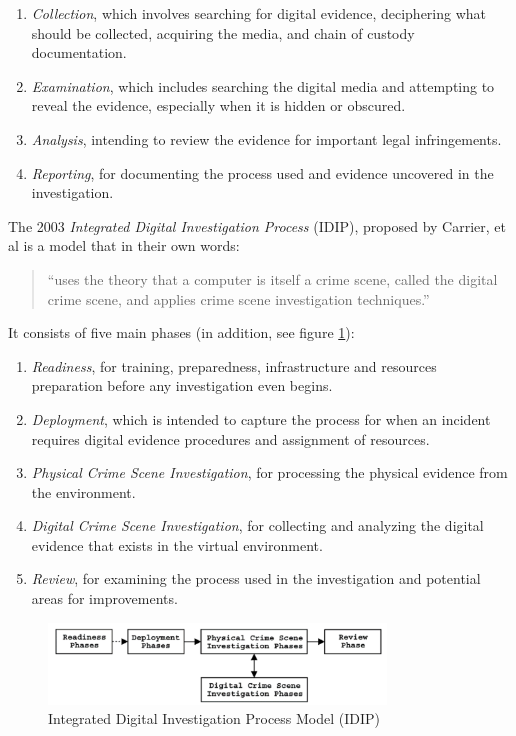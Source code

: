 \documentclass[12pt]{article}
\begin{document}
\begin{enumerate}
  \item {\em Collection}, which involves searching for digital evidence,
  deciphering what should be collected, acquiring the media,
  and chain of custody documentation.
  \item {\em Examination}, which includes searching the digital media
  and attempting to reveal the evidence, especially when it is
  hidden or obscured.
  \item {\em Analysis}, intending to review the evidence for important
  legal infringements. 
  \item {\em Reporting}, for documenting the process used and evidence
  uncovered in the investigation.
\end{enumerate}

The 2003 {\em Integrated Digital Investigation Process} (IDIP)\cite{carrier2003getting},
proposed by Carrier, et al is a model that in their own words:
\begin{quote}
``uses the theory
that a computer is itself a crime scene, called the digital crime scene, and applies crime scene
investigation techniques.''
\end{quote}
It consists of five main phases (in addition, see figure \ref{fig:IDIP}):

\begin{enumerate}
  \item {\em Readiness}, for training, preparedness, infrastructure and resources
  preparation before any investigation even begins.
  \item {\em Deployment}, which is intended to capture the process for when an 
  incident requires digital evidence procedures and assignment of resources.
  \item {\em Physical Crime Scene Investigation}, for processing the physical
  evidence from the environment.
  \item {\em Digital Crime Scene Investigation}, for collecting and
  analyzing the digital evidence that exists in the virtual environment.
  \item {\em Review}, for examining the process used in the investigation and
  potential areas for improvements. 
\end{enumerate}

\begin{figure}[ht]
  \centering
    \includegraphics[width=0.8\textwidth]{images/IDIP.png}
  \caption{Integrated Digital Investigation Process Model (IDIP)}
  \label{fig:IDIP}
\end{figure}
\end{document}
